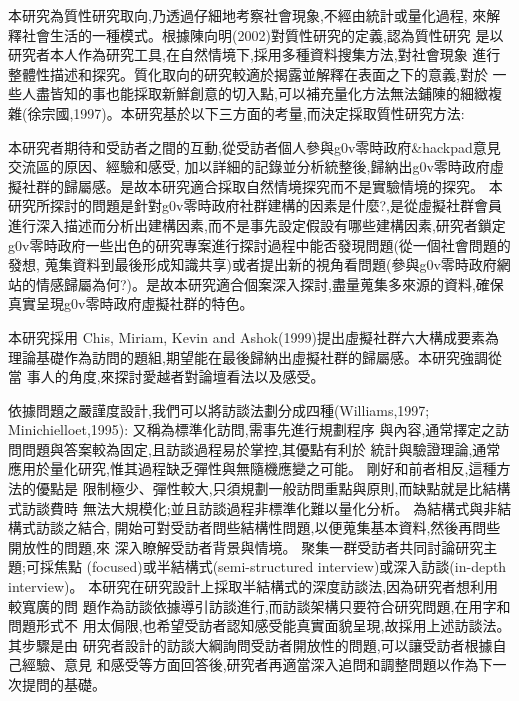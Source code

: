 
本研究為質性研究取向,乃透過仔細地考察社會現象,不經由統計或量化過程,
來解釋社會生活的一種模式。根據陳向明(2002)對質性研究的定義,認為質性研究
是以研究者本人作為研究工具,在自然情境下,採用多種資料搜集方法,對社會現象
進行整體性描述和探究。質化取向的研究較適於揭露並解釋在表面之下的意義,對於
一些人盡皆知的事也能採取新鮮創意的切入點,可以補充量化方法無法鋪陳的細緻複
雜(徐宗國,1997)。本研究基於以下三方面的考量,而決定採取質性研究方法:

本研究者期待和受訪者之間的互動,從受訪者個人參與g0v零時政府\&hackpad意見交流區的原因、經驗和感受,
加以詳細的記錄並分析統整後,歸納出g0v零時政府虛擬社群的歸屬感。是故本研究適合採取自然情境探究而不是實驗情境的探究。
本研究所探討的問題是針對g0v零時政府社群建構的因素是什麼?,是從虛擬社群會員進行深入描述而分析出建構因素,而不是事先設定假設有哪些建構因素,研究者鎖定g0v零時政府一些出色的研究專案進行探討過程中能否發現問題(從一個社會問題的發想, 蒐集資料到最後形成知識共享)或者提出新的視角看問題(參與g0v零時政府網站的情感歸屬為何?)。是故本研究適合個案深入探討,盡量蒐集多來源的資料,確保真實呈現g0v零時政府虛擬社群的特色。

本研究採用 Chis, Miriam, Kevin and Ashok(1999)提出虛擬社群六大構成要素為
理論基礎作為訪問的題組,期望能在最後歸納出虛擬社群的歸屬感。本研究強調從當
事人的角度,來探討愛越者對論壇看法以及感受。

依據問題之嚴謹度設計,我們可以將訪談法劃分成四種(Williams,1997;
Minichielloet,1995):
又稱為標準化訪問,需事先進行規劃程序
與內容,通常擇定之訪問問題與答案較為固定,且訪談過程易於掌控,其優點有利於
統計與驗證理論,通常應用於量化研究,惟其過程缺乏彈性與無隨機應變之可能。
剛好和前者相反,這種方法的優點是
限制極少、彈性較大,只須規劃一般訪問重點與原則,而缺點就是比結構式訪談費時
無法大規模化;並且訪談過程非標準化難以量化分析。
為結構式與非結構式訪談之結合,
開始可對受訪者問些結構性問題,以便蒐集基本資料,然後再問些開放性的問題,來
深入瞭解受訪者背景與情境。
聚集一群受訪者共同討論研究主題;可採焦點
(focused)或半結構式(semi-structured interview)或深入訪談(in-depth interview)。
本研究在研究設計上採取半結構式的深度訪談法,因為研究者想利用較寬廣的問
題作為訪談依據導引訪談進行,而訪談架構只要符合研究問題,在用字和問題形式不
用太侷限,也希望受訪者認知感受能真實面貌呈現,故採用上述訪談法。其步驟是由
研究者設計的訪談大綱詢問受訪者開放性的問題,可以讓受訪者根據自己經驗、意見
和感受等方面回答後,研究者再適當深入追問和調整問題以作為下一次提問的基礎。




